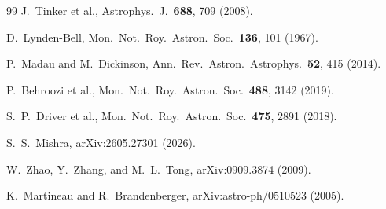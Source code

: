 \documentclass[aps,prd,twocolumn,superscriptaddress]{revtex4-2}
\begin{document}
\begin{thebibliography}{99}
J.~Tinker et al., Astrophys.\ J.\ \textbf{688}, 709 (2008).

D.~Lynden-Bell, Mon.\ Not.\ Roy.\ Astron.\ Soc.\ \textbf{136}, 101 (1967).

P.~Madau and M.~Dickinson, Ann.\ Rev.\ Astron.\ Astrophys.\ \textbf{52}, 415 (2014).

P.~Behroozi et al., Mon.\ Not.\ Roy.\ Astron.\ Soc.\ \textbf{488}, 3142 (2019).

S.~P.~Driver et al., Mon.\ Not.\ Roy.\ Astron.\ Soc.\ \textbf{475}, 2891 (2018).

S.~S.~Mishra, arXiv:2605.27301 (2026).

W.~Zhao, Y.~Zhang, and M.~L.~Tong, arXiv:0909.3874 (2009).

K.~Martineau and R.~Brandenberger, arXiv:astro-ph/0510523 (2005).

\end{thebibliography}
\end{document}
